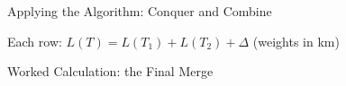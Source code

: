 \begin{frame}{Applying the Algorithm: Conquer and Combine}
  \centering
  \tiny
  \setlength{\tabcolsep}{2.5pt}
  \resizebox{\textwidth}{!}{}

  \medskip
  \footnotesize Each row: $L(T) = L(T_1) + L(T_2) + \Delta$ \quad (weights in km)
\end{frame}

\begin{frame}{Worked Calculation: the Final Merge}
  \small
  
\end{frame}
